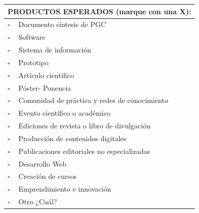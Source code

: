 \documentclass[11pt]{article}
\newcommand{\formlabel}[1]{\textbf{\small #1}}
\newcommand{\formcell}[1]{\small #1}
\begin{document}
\vspace{0.10cm}
\noindent
\begin{tabular}{|p{0.72cm}|p{14.50cm}|}
\hline
\multicolumn{2}{|p{15.38cm}|}{\formlabel{PRODUCTOS ESPERADOS (marque con una X):}} \\
\hline
$\square$ & \formcell{Documento síntesis de PGC} \\
\hline
$\square$ & \formcell{Software} \\
\hline
$\square$ & \formcell{Sistema de información} \\
\hline
$\square$ & \formcell{Prototipo} \\
\hline
$\square$ & \formcell{Artículo científico} \\
\hline
$\square$ & \formcell{Póster- Ponencia} \\
\hline
$\square$ & \formcell{Comunidad de práctica y redes de conocimiento} \\
\hline
$\square$ & \formcell{Evento científico o académico} \\
\hline
$\square$ & \formcell{Ediciones de revista o libro de divulgación} \\
\hline
$\square$ & \formcell{Producción de contenidos digitales} \\
\hline
$\square$ & \formcell{Publicaciones editoriales no especializadas} \\
\hline
$\square$ & \formcell{Desarrollo Web} \\
\hline
$\square$ & \formcell{Creación de cursos} \\
\hline
$\square$ & \formcell{Emprendimiento e innovación} \\
\hline
$\square$ & \formcell{Otro ¿Cuál?} \\
\hline
\end{tabular}
\end{document}
